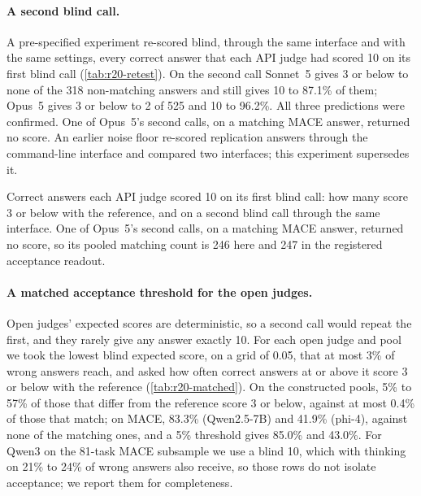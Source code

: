 \paragraph{A second blind call.}
A pre-specified experiment re-scored blind, through the same interface and with the same settings, every correct answer that each API judge had scored 10 on its first blind call (\cref{tab:r20-retest}). On the second call Sonnet~5 gives 3 or below to none of the 318 non-matching answers and still gives 10 to 87.1\% of them; Opus~5 gives 3 or below to 2 of 525 and 10 to 96.2\%. All three predictions were confirmed. One of Opus~5's second calls, on a matching \textsc{MACE} answer, returned no score. An earlier noise floor re-scored replication answers through the command-line interface and compared two interfaces; this experiment supersedes it.

\begin{table}[htbp]
\centering
\caption{Correct answers each API judge scored 10 on its first blind call: how many score 3 or below with the reference, and on a second blind call through the same interface. One of Opus~5's second calls, on a matching \textsc{MACE} answer, returned no score, so its pooled matching count is 246 here and 247 in the registered acceptance readout.\pre}
\label{tab:r20-retest}
\footnotesize
\begin{adjustbox}{max width=\linewidth}\end{adjustbox}
\end{table}

\paragraph{A matched acceptance threshold for the open judges.}
Open judges' expected scores are deterministic, so a second call would repeat the first, and they rarely give any answer exactly 10. For each open judge and pool we took the lowest blind expected score, on a grid of 0.05, that at most 3\% of wrong answers reach, and asked how often correct answers at or above it score 3 or below with the reference (\cref{tab:r20-matched}). On the constructed pools, 5\% to 57\% of those that differ from the reference score 3 or below, against at most 0.4\% of those that match; on \textsc{MACE}, 83.3\% (Qwen2.5-7B) and 41.9\% (phi-4), against none of the matching ones, and a 5\% threshold gives 85.0\% and 43.0\%.\ph{} For Qwen3 on the 81-task \textsc{MACE} subsample we use a blind 10, which with thinking on 21\% to 24\% of wrong answers also receive, so those rows do not isolate acceptance; we report them for completeness.

